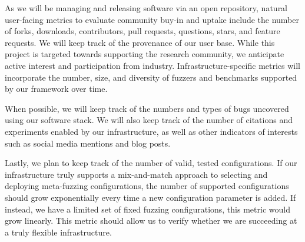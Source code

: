 \label{sec:metrics}

As we will be managing and releasing software via an open repository, 
natural user-facing metrics to evaluate community buy-in and uptake include the number of forks, downloads, contributors, pull requests, questions, 
stars, and feature requests. 
We will keep track of the provenance of our user base. While this project is targeted towards supporting the research community, 
we anticipate active interest and participation from industry. 
Infrastructure-specific metrics will incorporate the number, size, and diversity of fuzzers and benchmarks supported by our framework over time.

When possible, we will keep track of the numbers and types of bugs uncovered using our software stack.
We will also keep track of the number of citations and experiments enabled by our infrastructure, as well 
as other indicators of interests such as social media mentions and blog posts.

Lastly, we plan to keep track of the number of valid, tested configurations.  If our infrastructure truly supports a 
mix-and-match approach to selecting and deploying meta-fuzzing configurations, the number of supported configurations 
should grow exponentially every time a new configuration parameter is added.  If instead, we have a limited set of fixed
fuzzing configurations, this metric would grow linearly.  This metric should allow us to verify whether we are succeeding at a truly
flexible infrastructure.
